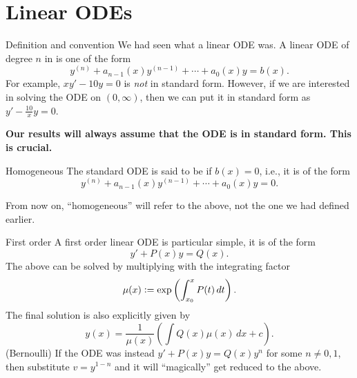 \documentclass[dvipsnames]{beamer}
\theoremstyle{definition}
\begin{document}
\section{Linear ODEs}

\begin{frame}{Definition and convention}
  We had seen what a linear ODE was. \pause A linear ODE of degree $n$ in  is one of the form
  \begin{equation*} 
    y^{(n)} + a_{n - 1}(x) y^{(n - 1)} + \cdots + a_{0}(x) y = b(x).
  \end{equation*} \pause
  For example, $xy' - 10y = 0$ is \emph{not} in standard form. \pause However, if we are interested in solving the ODE on $(0, \infty)$, then we can put it in standard form as \pause $y' - \frac{10}{x} y = 0$. \pause

  \begin{tcolorbox}[colback=red!5,colframe=red!75!,title=Disclaimer]
    \textbf{Our results will always assume that the ODE is in standard form. This is crucial.}
  \end{tcolorbox}
\end{frame}
\begin{frame}{Homogeneous}
  The standard ODE is said to be  if $b(x) = 0$, i.e., it is of the form
  \begin{equation*} 
    y^{(n)} + a_{n - 1}(x) y^{(n - 1)} + \cdots + a_{0}(x) y = 0.
  \end{equation*} \pause

  From now on, ``homogeneous'' will refer to the above, not the one we had defined earlier.
\end{frame}

\begin{frame}{First order}
  A first order linear ODE is particular simple, \pause it is of the form
  \begin{equation*} 
    y' + P(x) y = Q(x).
  \end{equation*}
  \pause The above can be solved by multiplying with the integrating factor
  \begin{equation*} 
    \mu(x) \vcentcolon= \exp\left(\int_{x_{0}}^{x} P(t) \,dt\right).
  \end{equation*} \pause
  The final solution is also explicitly given by
  \begin{equation*} 
    y(x) = \frac{1}{\mu(x)} \left(\int Q(x) \mu(x) \,dx + c\right).
  \end{equation*} \pause
  (Bernoulli) If the ODE was instead $y' + P(x)y = Q(x) y^{n}$ for some $n \neq 0, 1$, then substitute $v = y^{1 - n}$ and it will ``magically'' get reduced to the above.
\end{frame}
\end{document}
